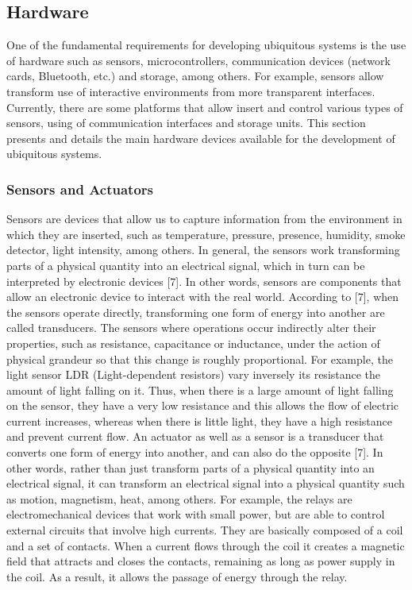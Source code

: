 \documentclass{acm_proc_article-sp}
\begin{document}
\subsection{Hardware}
One of the fundamental requirements for developing ubiquitous systems is the use of hardware such as sensors, microcontrollers, communication devices (network cards, Bluetooth, etc.) and storage, among others. For example, sensors allow transform use of interactive environments from more transparent interfaces. Currently, there are some platforms that allow insert and control various types of sensors, using of communication interfaces and storage units. This section presents and details the main hardware devices available for the development of ubiquitous systems.


\subsubsection{Sensors and Actuators}
Sensors are devices that allow us to capture information from the environment in which they are inserted, such as temperature, pressure, presence, humidity, smoke detector, light intensity, among others. In general, the sensors work transforming parts of a physical quantity into an electrical signal, which in turn can be interpreted by electronic devices [7]. In other words, sensors are components that allow an electronic device to interact with the real world.
\newline
\newline
According to [7], when the sensors operate directly, transforming one form of energy into another are called transducers. The sensors where operations occur indirectly alter their properties, such as resistance, capacitance or inductance, under the action of physical grandeur so that this change is roughly proportional. For example, the light sensor LDR (Light-dependent resistors) vary inversely its resistance the amount of light falling on it. Thus, when there is a large amount of light falling on the sensor, they have a very low resistance and this allows the flow of electric current increases, whereas when there is little light, they have a high resistance and prevent current flow.
\newline
\newline
An actuator as well as a sensor is a transducer that converts one form of energy into another, and can also do the opposite [7]. In other words, rather than just  transform parts of a physical quantity into an electrical signal, it can transform an electrical signal into a physical quantity such as motion, magnetism, heat, among others. For example, the relays are electromechanical devices that work with small power, but are able to control external circuits that involve high currents. They are basically composed of a coil and a set of contacts. When a current flows through the coil it creates a magnetic field that attracts and closes the contacts, remaining as long as power supply in the coil. As a result, it allows the passage of energy through the relay.
\end{document}
